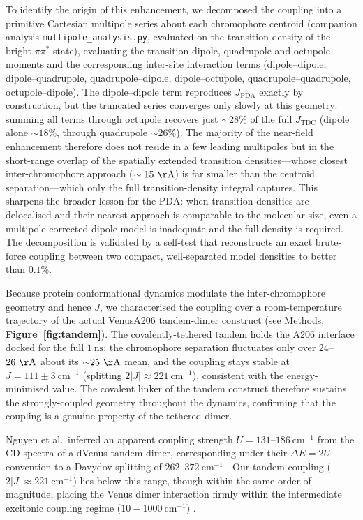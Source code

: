 \documentclass[journal=jpcbfk, manuscript=article, layout=twocolumn, doi=true]{achemso}
\begin{document}
To identify the origin of this enhancement, we decomposed the coupling into a primitive Cartesian multipole series about each chromophore centroid (companion analysis \texttt{multipole\_analysis.py}, evaluated on the transition density of the bright $\pi\pi^{*}$ state), evaluating the transition dipole, quadrupole and octupole moments and the corresponding inter-site interaction terms (dipole--dipole, dipole--quadrupole, quadrupole--dipole, dipole--octupole, quadrupole--quadrupole, octupole--dipole). The dipole--dipole term reproduces $J_{\text{PDA}}$ exactly by construction, but the truncated series converges only slowly at this geometry: summing all terms through octupole recovers just $\sim 28\%$ of the full $J_{\text{TDC}}$ (dipole alone $\sim 18\%$, through quadrupole $\sim 26\%$). The majority of the near-field enhancement therefore does not reside in a few leading multipoles but in the short-range overlap of the spatially extended transition densities---whose closest inter-chromophore approach ($\sim 15~\mathrm{\AA}$) is far smaller than the centroid separation---which only the full transition-density integral captures. This sharpens the broader lesson for the PDA: when transition densities are delocalised and their nearest approach is comparable to the molecular size, even a multipole-corrected dipole model is inadequate and the full density is required. The decomposition is validated by a self-test that reconstructs an exact brute-force coupling between two compact, well-separated model densities to better than $0.1\%$.

Because protein conformational dynamics modulate the inter-chromophore geometry and hence $J$, we characterised the coupling over a room-temperature trajectory of the actual VenusA206 tandem-dimer construct (see Methods, \textbf{Figure~\ref{fig:tandem}}). The covalently-tethered tandem holds the A206 interface docked for the full $1~\mathrm{ns}$: the chromophore separation fluctuates only over $24$--$26~\mathrm{\AA}$ about its ${\sim}25~\mathrm{\AA}$ mean, and the coupling stays stable at $J = 111 \pm 3~\mathrm{cm^{-1}}$ (splitting $2|J| \approx 221~\mathrm{cm^{-1}}$), consistent with the energy-minimised value. The covalent linker of the tandem construct therefore sustains the strongly-coupled geometry throughout the dynamics, confirming that the coupling is a genuine property of the tethered dimer.

Nguyen et al.\ inferred an apparent coupling strength $U = 131$--$186~\mathrm{cm^{-1}}$ from the CD spectra of a dVenus tandem dimer, corresponding under their $\Delta E = 2U$ convention to a Davydov splitting of $262$--$372~\mathrm{cm^{-1}}$ \cite{nguyen2025anomalous}. Our tandem coupling ($2|J| \approx 221~\mathrm{cm^{-1}}$) lies below this range, though within the same order of magnitude, placing the Venus dimer interaction firmly within the intermediate excitonic coupling regime ($10 - 1000~\mathrm{cm^{-1}}$) \cite{nguyen2025anomalous, kim2019venusa206}.
\end{document}
